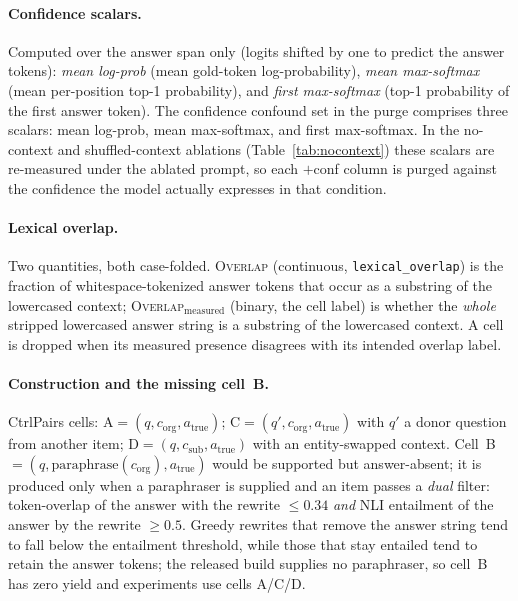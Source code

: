 \paragraph{Confidence scalars.}
Computed over the answer span only (logits shifted by one to predict the answer
tokens): \emph{mean log-prob} (mean gold-token log-probability), \emph{mean
max-softmax} (mean per-position top-1 probability), and \emph{first max-softmax}
(top-1 probability of the first answer token). The confidence confound set in the
purge comprises three scalars: mean log-prob, mean max-softmax, and first max-softmax.
In the no-context and shuffled-context ablations (Table~\ref{tab:nocontext}) these
scalars are re-measured under the ablated prompt, so each $+$conf column is purged
against the confidence the model actually expresses in that condition.

\paragraph{Lexical overlap.}
Two quantities, both case-folded. \textsc{Overlap} (continuous, \texttt{lexical\_overlap})
is the fraction of whitespace-tokenized answer tokens that occur as a substring of the
lowercased context; \textsc{Overlap}$_{\text{measured}}$ (binary, the cell label) is
whether the \emph{whole} stripped lowercased answer string is a substring of the
lowercased context. A cell is dropped when its measured presence disagrees with its
intended overlap label.

\paragraph{Construction and the missing cell~B.}
CtrlPairs cells: A$=(q, c_{\text{org}}, a_{\text{true}})$; C$=(q', c_{\text{org}},
a_{\text{true}})$ with $q'$ a donor question from another item;
D$=(q, c_{\text{sub}}, a_{\text{true}})$ with an entity-swapped context. Cell~B
$=(q, \text{paraphrase}(c_{\text{org}}), a_{\text{true}})$ would be supported but
answer-absent; it is produced only when a paraphraser is supplied and an item passes a
\emph{dual} filter: token-overlap of the answer with the rewrite $\le 0.34$
\emph{and} NLI entailment of the answer by the rewrite $\ge 0.5$. Greedy rewrites that
remove the answer string tend to fall below the entailment threshold, while those that
stay entailed tend to retain the answer tokens; the released build supplies no
paraphraser, so cell~B has zero yield and experiments use cells A/C/D.

